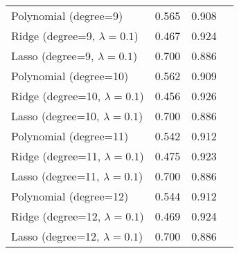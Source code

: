 \begin{table}
\begin{tabular}{|l|l|c|c|}
           Polynomial (degree=9) & 0.565 & 0.908 \\
 Ridge (degree=9, $\lambda=0.1$) & 0.467 & 0.924 \\
 Lasso (degree=9, $\lambda=0.1$) & 0.700 & 0.886 \\
          Polynomial (degree=10) & 0.562 & 0.909 \\
Ridge (degree=10, $\lambda=0.1$) & 0.456 & 0.926 \\
Lasso (degree=10, $\lambda=0.1$) & 0.700 & 0.886 \\
          Polynomial (degree=11) & 0.542 & 0.912 \\
Ridge (degree=11, $\lambda=0.1$) & 0.475 & 0.923 \\
Lasso (degree=11, $\lambda=0.1$) & 0.700 & 0.886 \\
          Polynomial (degree=12) & 0.544 & 0.912 \\
Ridge (degree=12, $\lambda=0.1$) & 0.469 & 0.924 \\
Lasso (degree=12, $\lambda=0.1$) & 0.700 & 0.886 \\
\bottomrule
\end{tabular}
\end{table}
